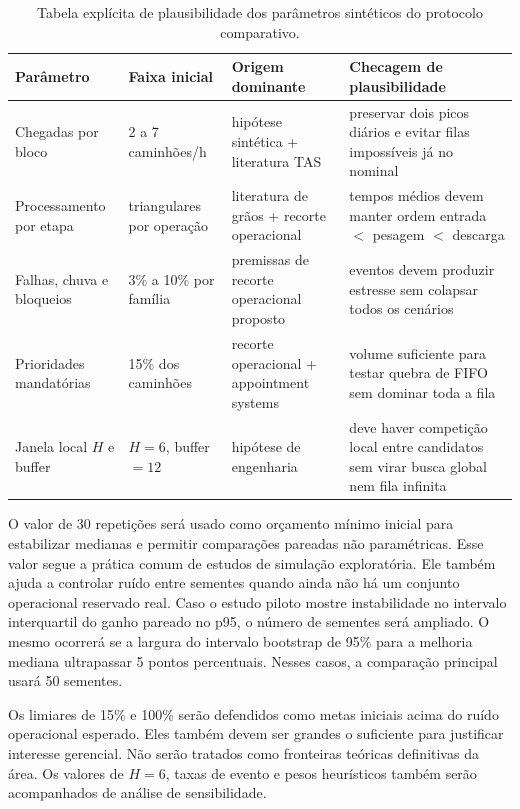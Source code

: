 \documentclass[
  12pt,
  oneside,
  a4paper,
  sumario=tradicional,
  brazil
]{abntex2}
\begin{document}
\begin{table}[H]
\centering
\small
\begin{tabular}{|p{}|p{}|p{}|p{}|}
\hline
\textbf{Par\^ametro} & \textbf{Faixa inicial} & \textbf{Origem dominante} & \textbf{Checagem de plausibilidade} \\
\hline
Chegadas por bloco & 2 a 7 caminh\~oes/h & hip\'otese sint\'etica + literatura TAS & preservar dois picos di\'arios e evitar filas imposs\'iveis j\'a no nominal \\
\hline
Processamento por etapa & triangulares por opera\c{c}\~ao & literatura de gr\~aos + recorte operacional & tempos m\'edios devem manter ordem entrada $<$ pesagem $<$ descarga \\
\hline
Falhas, chuva e bloqueios & 3\% a 10\% por fam\'ilia & premissas de recorte operacional proposto & eventos devem produzir estresse sem colapsar todos os cen\'arios \\
\hline
Prioridades mandat\'orias & 15\% dos caminh\~oes & recorte operacional + appointment systems & volume suficiente para testar quebra de FIFO sem dominar toda a fila \\
\hline
Janela local $H$ e buffer & $H=6$, buffer $=12$ & hip\'otese de engenharia & deve haver competi\c{c}\~ao local entre candidatos sem virar busca global nem fila infinita \\
\hline
\end{tabular}
\caption{Tabela expl\'icita de plausibilidade dos par\^ametros sint\'eticos do protocolo comparativo.}
\end{table}

O valor de 30 repeti\c{c}\~oes ser\'a usado como or\c{c}amento m\'inimo inicial para estabilizar medianas e permitir compara\c{c}\~oes pareadas n\~ao param\'etricas. Esse valor segue a pr\'atica comum de estudos de simula\c{c}\~ao explorat\'oria. Ele tamb\'em ajuda a controlar ru\'ido entre sementes quando ainda n\~ao h\'a um conjunto operacional reservado real. Caso o estudo piloto mostre instabilidade no intervalo interquartil do ganho pareado no p95, o n\'umero de sementes ser\'a ampliado. O mesmo ocorrer\'a se a largura do intervalo bootstrap de 95\% para a melhoria mediana ultrapassar 5 pontos percentuais. Nesses casos, a compara\c{c}\~ao principal usar\'a 50 sementes.

Os limiares de 15\% e 100\% ser\~ao defendidos como metas iniciais acima do ru\'ido operacional esperado. Eles tamb\'em devem ser grandes o suficiente para justificar interesse gerencial. N\~ao ser\~ao tratados como fronteiras te\'oricas definitivas da \'area. Os valores de $H=6$, taxas de evento e pesos heur\'isticos tamb\'em ser\~ao acompanhados de an\'alise de sensibilidade.
\end{document}
